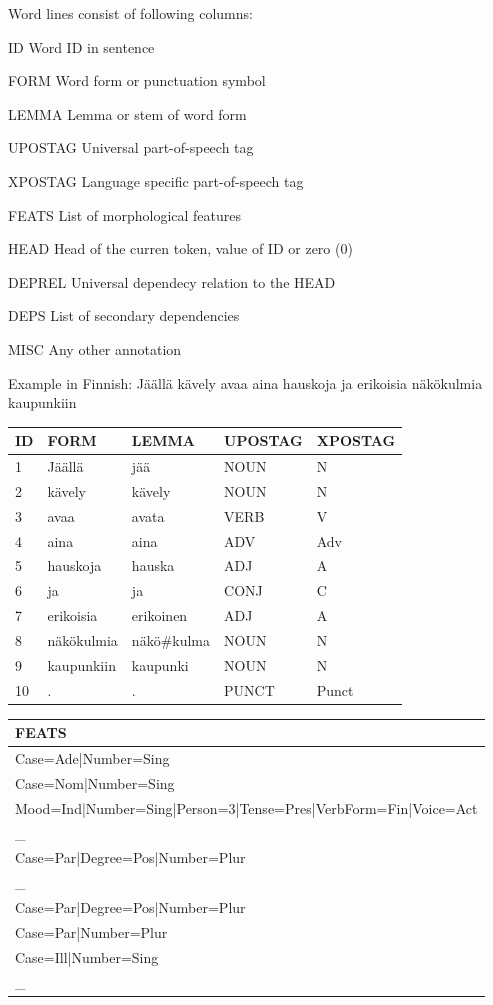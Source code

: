 \documentclass[12pt,a4paper,english
]{tutthesis}
\begin{document}
Word lines consist of following columns:
\begin{termlist}
\item[ID] Word ID in sentence
\item[FORM] Word form or punctuation symbol
\item[LEMMA] Lemma or stem of word form
\item[UPOSTAG] Universal part-of-speech tag
\item[XPOSTAG] Language specific part-of-speech tag
\item[FEATS] List of morphological features
\item[HEAD] Head of the curren token, value of ID or zero (0)
\item[DEPREL] Universal dependecy relation to the HEAD
\item[DEPS] List of secondary dependencies
\item[MISC] Any other annotation
\end{termlist}

Example in Finnish: Jäällä kävely avaa aina hauskoja ja erikoisia näkökulmia kaupunkiin

\begin{tabular}{l l l l l} 
ID & FORM & LEMMA & UPOSTAG & XPOSTAG \\
\hline
1 & Jäällä & jää & NOUN & N \\
2 & kävely & kävely & NOUN & N \\
3 & avaa & avata & VERB & V \\
4 & aina & aina & ADV & Adv \\
5 & hauskoja & hauska & ADJ & A \\
6 & ja & ja & CONJ & C \\
7 & erikoisia & erikoinen & ADJ & A \\
8 & näkökulmia & näkö\#kulma & NOUN & N \\
9 & kaupunkiin & kaupunki & NOUN & N \\
10 & . & . & PUNCT & Punct
\end{tabular}

\begin{tabular}{l}
FEATS \\
\hline
Case=Ade|Number=Sing \\
Case=Nom|Number=Sing \\
Mood=Ind|Number=Sing|Person=3|Tense=Pres|VerbForm=Fin|Voice=Act \\
\_ \\
Case=Par|Degree=Pos|Number=Plur \\
\_ \\
Case=Par|Degree=Pos|Number=Plur \\
Case=Par|Number=Plur \\
Case=Ill|Number=Sing \\
\_
\end{tabular}
\end{document}
